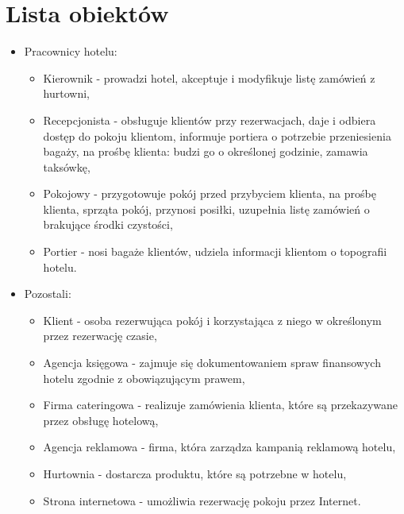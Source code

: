 \documentclass[a4paper, 11pt]{article}
\begin{document}
	\section{Lista obiektów}	
	
	\begin{itemize}
			\item Pracownicy hotelu:
			
			\begin{itemize}
				\item Kierownik - prowadzi hotel, akceptuje i modyfikuje listę zamówień z hurtowni,
				
				\item Recepcjonista - obsługuje klientów przy rezerwacjach, daje i odbiera dostęp do pokoju klientom, informuje portiera o potrzebie przeniesienia bagaży, na prośbę klienta: budzi go o określonej godzinie, zamawia taksówkę,
				
				\item Pokojowy - przygotowuje pokój przed przybyciem klienta, na prośbę klienta, sprząta pokój, przynosi posiłki, uzupełnia listę zamówień o brakujące środki czystości,
				
				\item Portier - nosi bagaże klientów, udziela informacji klientom o topografii hotelu.
				
			\end{itemize}
		
		\item Pozostali:
		
		\begin{itemize}
			\item Klient - osoba rezerwująca pokój i korzystająca z niego w określonym przez rezerwację czasie,
			
			\item Agencja księgowa - zajmuje się dokumentowaniem spraw finansowych hotelu zgodnie z obowiązującym prawem,
			
			\item Firma cateringowa - realizuje zamówienia klienta, które są przekazywane przez obsługę hotelową,
			
			\item Agencja reklamowa - firma, która zarządza kampanią reklamową hotelu,
			\item Hurtownia - dostarcza produktu, które są potrzebne w hotelu,
			
			\item Strona internetowa - umożliwia rezerwację pokoju przez Internet.
				\vfill	
		\end{itemize}
		
		
		
		
	\end{itemize}
	
\end{document}
